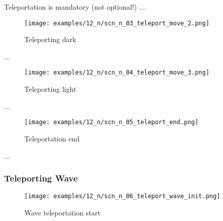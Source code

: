 Teleportation is mandatory (not optional!) ...

\clearpage %

\noindent
\begin{figure}[!h]
\texttt{[image: examples/12\_n/scn\_n\_03\_teleport\_move\_2.png]}
\caption{Teleporting dark}
\label{fig:scn_n_03_teleport_move_2}
\end{figure}

...

\clearpage %

\noindent
\begin{figure}[!h]
\texttt{[image: examples/12\_n/scn\_n\_04\_teleport\_move\_3.png]}
\caption{Teleporting light}
\label{fig:scn_n_04_teleport_move_3}
\end{figure}

...

\clearpage %

\noindent
\begin{figure}[!h]
\texttt{[image: examples/12\_n/scn\_n\_05\_teleport\_end.png]}
\caption{Teleportation end}
\label{fig:scn_n_05_teleport_end}
\end{figure}

...


\clearpage %

\subsubsection*{Teleporting Wave}

\noindent
\begin{figure}[!h]
\texttt{[image: examples/12\_n/scn\_n\_06\_teleport\_wave\_init.png]}
\caption{Wave teleportation start}
\label{fig:scn_n_06_teleport_wave_init}
\end{figure}

